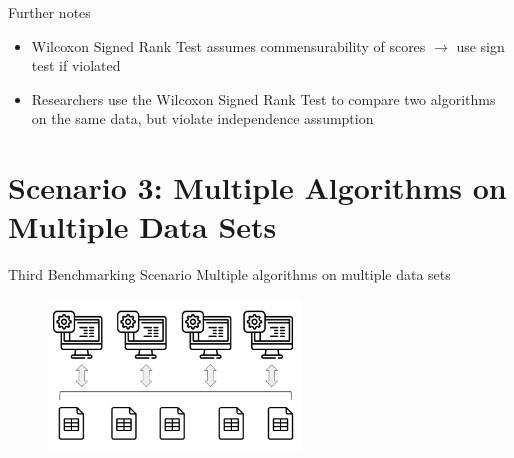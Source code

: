 \documentclass[11pt,compress,t,notes=noshow, aspectratio=169, xcolor=table]{beamer}
\begin{document}
\begin{frame}{Further notes}
    \vfill
    \begin{itemize}
        \item Wilcoxon Signed Rank Test assumes commensurability of scores $\rightarrow{}$ use sign test if violated
        \item Researchers use the Wilcoxon Signed Rank Test to compare two algorithms on the same data, but violate independence assumption
    \end{itemize}
    \vfill
\end{frame}



\section{Scenario 3: Multiple Algorithms on Multiple Data Sets}
\begin{frame}{Third Benchmarking Scenario}
\vfill
\centering
\large{Multiple algorithms on multiple data sets}
    \begin{figure}
        \includegraphics[width = 0.6\textwidth]{figure/multiplalgos_multipledatasets.png}
    \end{figure}
\vfill
\end{frame}
\end{document}
